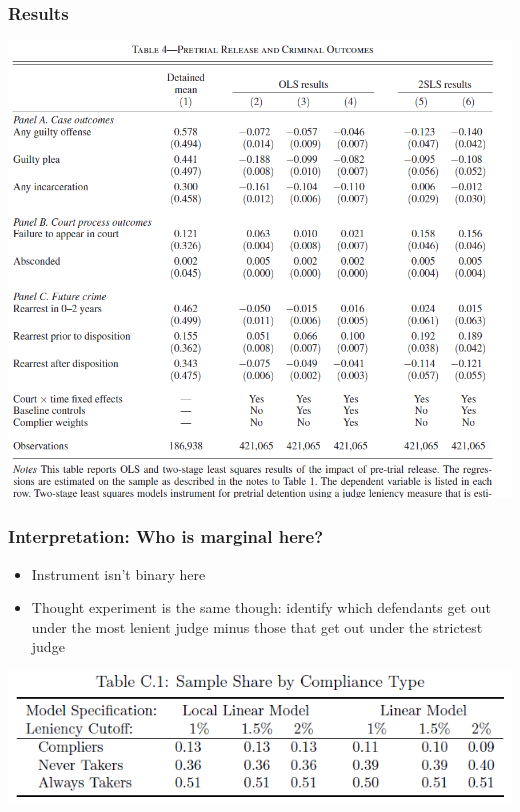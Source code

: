 \begin{frame}
  \frametitle{Results}
  \begin{center}
    \includegraphics[width=.9\textwidth]{./resources/DobbieResults}
  \end{center}  
\end{frame}

\begin{frame}
  \frametitle{Interpretation: Who is marginal here?}
  \pause 
  \begin{itemize}
    \item Instrument isn't binary here
    \item Thought experiment is the same though: identify which defendants get out under the most lenient judge minus those that get out under the strictest judge 
   \end{itemize}
   \includegraphics[width=.9\textwidth]{./resources/DobbieCompliers} 
\end{frame}

